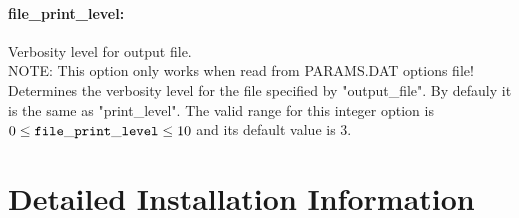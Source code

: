 \documentclass[letter,10pt]{article}
\begin{document}
\paragraph{file\_print\_level:} Verbosity level for output file. $\;$ \\
 NOTE: This option only works when read from
PARAMS.DAT options file! Determines the verbosity
level for the file specified by "output\_file". 
By defauly it is the same as "print\_level". The valid range for this integer option is
$0 \le {\tt file\_print\_level } \le 10$
and its default value is $3$.

\newpage
\section{Detailed Installation Information}\label{ExpertInstall}
\end{document}
